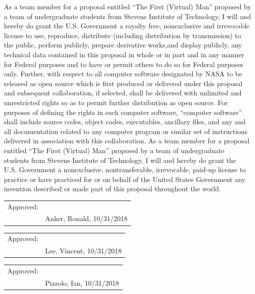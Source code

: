 \documentclass{article}
\begin{document}
As a team member for a proposal entitled “The First (Virtual) Man” proposed by a team of undergraduate students from Stevens Institute of Technology, I will and hereby do grant the U.S. Government a royalty free, nonexclusive and irrevocable license to use, reproduce, distribute (including distribution by transmission) to the public, perform publicly, prepare derivative works,and display publicly, any technical data contained in this proposal in whole or in part and in any manner for Federal purposes and to have or permit others to do so for
Federal purposes only. Further, with respect to all computer software designated by
NASA to be released as open source which is first produced or delivered under this
proposal and subsequent collaboration, if selected, shall be delivered with unlimited and
unrestricted rights so as to permit further distribution as open source. For purposes of
defining the rights in such computer software, “computer software” shall include source
codes, object codes, executables, ancillary files, and any and all documentation related
to any computer program or similar set of instructions delivered in association with this
collaboration. As a team member for a proposal entitled “The First (Virtual) Man” proposed by a team of undergraduate students from Stevens Institute of Technology, I will and hereby do
grant the U.S. Government a nonexclusive, nontransferable, irrevocable, paid-up
license to practice or have practiced for or on behalf of the United States Government
any invention described or made part of this proposal throughout the world.

\bigskip
\bigskip
\bigskip

\begin{tabular}{@{}p{.5in}p{3.5in}@{}}
Approved: & \hrulefill \\
& Anker, Ronald, 10/31/2018\\
\end{tabular}

\bigskip
\bigskip
\bigskip

\begin{tabular}{@{}p{.5in}p{3.5in}@{}}
Approved: & \hrulefill \\
& Lee, Vincent, 10/31/2018\\
\end{tabular}

\bigskip
\bigskip
\bigskip

\begin{tabular}{@{}p{.5in}p{3.5in}@{}}
Approved: & \hrulefill \\
& Pizzolo, Ian, 10/31/2018\\
\end{tabular}
\end{document}
